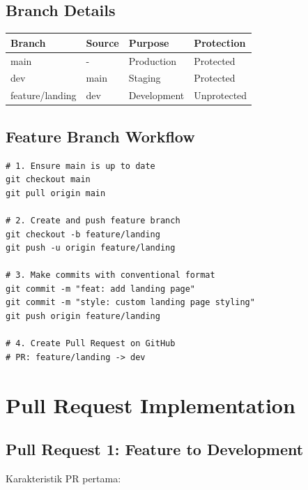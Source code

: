 \documentclass[a4paper,oneside,11pt]{book}
\begin{document}
\subsection{Branch Details}

\begin{center}
\begin{tabular}{|l|l|l|l|}
\hline
\textbf{Branch} & \textbf{Source} & \textbf{Purpose} & \textbf{Protection} \\
\hline
main & - & Production & Protected \\
\hline
dev & main & Staging & Protected \\
\hline
feature/landing & dev & Development & Unprotected \\
\hline
\end{tabular}
\end{center}

\subsection{Feature Branch Workflow}

\begin{lstlisting}[style=yamlStyle, caption={Feature Branch Creation Commands}, label={kode:featurebranch}]
# 1. Ensure main is up to date
git checkout main
git pull origin main

# 2. Create and push feature branch
git checkout -b feature/landing
git push -u origin feature/landing

# 3. Make commits with conventional format
git commit -m "feat: add landing page"
git commit -m "style: custom landing page styling"
git push origin feature/landing

# 4. Create Pull Request on GitHub
# PR: feature/landing -> dev
\end{lstlisting}

\newpage

\section{Pull Request Implementation}

\subsection{Pull Request 1: Feature to Development}

Karakteristik PR pertama:
\end{document}
